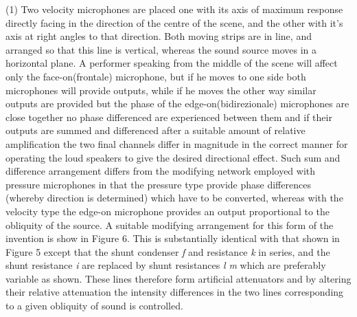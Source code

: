 \documentclass[11pt]{article}
\begin{document}
\begin{multicols*}{2}
(1) Two velocity microphones are placed one with its axis of maximum response directly facing in the direction of the centre of the scene, and the other with it’s axis at right angles to that direction. Both moving strips are in line, and arranged so that this line is vertical, whereas the sound source moves in a horizontal plane. A performer speaking from the middle of the scene will affect only the face-on(frontale) microphone, but if he moves to one side both microphones will provide outputs, while if he moves the other way similar outputs are provided but the phase of the edge-on(bidirezionale) microphones are close together no phase differenced are experienced between them and if their outputs are summed and differenced after a suitable amount of relative amplification the two final channels differ in magnitude in the correct manner for operating the loud speakers to give the desired directional effect. Such sum and difference arrangement differs from the modifying network employed with pressure microphones in that the pressure type provide phase differences (whereby direction is determined) which have to be converted, whereas with the velocity type the edge-on microphone provides an output proportional to the obliquity of the source. A suitable modifying arrangement for this form of the invention is show in Figure 6. This is substantially identical with that shown in Figure 5 except that the shunt condenser \textit{f} and resistance \textit{k} in series, and the shunt resistance \textit{i} are replaced by shunt resistances \textit{l m} which are preferably variable as shown. These lines therefore form artificial attenuators and by altering their relative attenuation the intensity differences in the two lines corresponding to a given obliquity of sound is controlled.


\end{multicols*}
\end{document}
